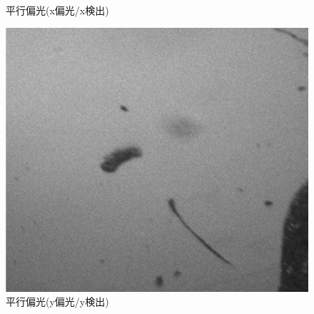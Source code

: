 \documentclass[11pt,a4paper]{jsarticle}
\begin{document}
\begin{figure}[htbp]
\begin{minipage}{0.333\hsize}
\begin{center}
  \end{center}
  \caption{平行偏光(x偏光/x検出)}
  \label{fig:hh300}
 \end{minipage}
 \begin{minipage}{0.333\hsize}
  \begin{center}
   \includegraphics[width=\hsize]{vv300.eps}
  \end{center}
  \caption{平行偏光(y偏光/y検出)}
  \label{fig:vv300}
 \end{minipage}
\end{figure}
\end{document}
